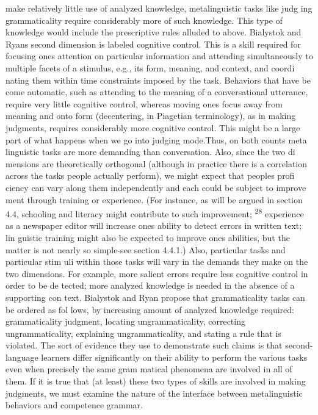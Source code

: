 \begin{styleTextbody}
make relatively little use of analyzed knowledge, metalinguistic tasks like judg\- ing grammaticality require considerably more of such knowledge. This type of knowledge would include the prescriptive rules alluded to above. Bialystok and Ryan{\textquotesingle}s second dimension is labeled cognitive control. This is a skill required for focusing one{\textquotesingle}s attention on particular information and attending simultaneously to multiple facets of a stimulus, e.g., its form, meaning, and context, and coordi\- nating them within time constraints imposed by the task. Behaviors that have be\- come automatic, such as attending to the meaning of a conversational utterance, require very little cognitive control, whereas moving one{\textquotesingle}s focus away from meaning and onto form (decentering, in Piagetian terminology), as in making judgments, requires considerably more cognitive control. This might be a large part of what happens when we go into {\textquotedbl}judging mode.{\textquotedbl}Thus, on both counts meta\- linguistic tasks are more demanding than conversation. Also, since the two di\- mensions are theoretically orthogonal (although in practice there is a correlation across the tasks people actually perform), we might expect that people{\textquotesingle}s profi\- ciency can vary along them independently and each could be subject to improve\- ment through training or experience. (For instance, as will be argued in section 4.4, schooling and literacy might contribute to such improvement; \textsuperscript{28}\textsuperscript{ }experience as a newspaper editor will increase one{\textquotesingle}s ability to detect errors in written text; lin\- guistic training might also be expected to improve one{\textquotesingle}s abilities, but the matter is not nearly so simple-see section 4.4.1.) Also, particular tasks and particular stim\- uli within those tasks will vary in the demands they make on the two dimensions. For example, more salient errors require less cognitive control in order to be de\- tected; more analyzed knowledge is needed in the absence of a supporting con\- text. Bialystok and Ryan propose that grammaticality tasks can be ordered as fol\- lows, by increasing amount of analyzed knowledge required: grammaticality judgment, locating ungrammaticality, correcting ungrammaticality, explaining ungrammaticality, and stating a rule that is violated. The sort of evidence they use to demonstrate such claims is that second-language learners differ significantly on their ability to perform the various tasks even when precisely the same gram\- matical phenomena are involved in all of them. If it is true that (at least) these two types of skills are involved in making judgments, we must examine the nature of the interface between metalinguistic behaviors and competence grammar.
\end{styleTextbody}


